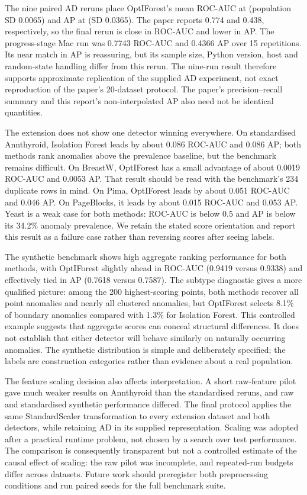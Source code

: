 The nine paired AD reruns place OptIForest's mean ROC-AUC at \adAuc{} (population SD 0.0065) and AP at \adAp{} (SD 0.0365). The paper reports 0.774 and 0.438, respectively, so the final rerun is close in ROC-AUC and lower in AP. The progress-stage Mac run was 0.7743 ROC-AUC and 0.4366 AP over 15 repetitions. Its near match in AP is reassuring, but its sample size, Python version, host and random-state handling differ from this rerun. The nine-run result therefore supports approximate replication of the supplied AD experiment, not exact reproduction of the paper's 20-dataset protocol. The paper's precision--recall summary and this report's non-interpolated AP also need not be identical quantities.

The extension does not show one detector winning everywhere. On standardised Annthyroid, Isolation Forest leads by about 0.086 ROC-AUC and 0.086 AP; both methods rank anomalies above the prevalence baseline, but the benchmark remains difficult. On BreastW, OptIForest has a small advantage of about 0.0019 ROC-AUC and 0.0053 AP. That result should be read with the benchmark's 234 duplicate rows in mind. On Pima, OptIForest leads by about 0.051 ROC-AUC and 0.046 AP. On PageBlocks, it leads by about 0.015 ROC-AUC and 0.053 AP. Yeast is a weak case for both methods: ROC-AUC is below 0.5 and AP is below its 34.2\% anomaly prevalence. We retain the stated score orientation and report this result as a failure case rather than reversing scores after seeing labels.

The synthetic benchmark shows high aggregate ranking performance for both methods, with OptIForest slightly ahead in ROC-AUC (0.9419 versus 0.9338) and effectively tied in AP (0.7618 versus 0.7587). The subtype diagnostic gives a more qualified picture: among the 200 highest-scoring points, both methods recover all point anomalies and nearly all clustered anomalies, but OptIForest selects 8.1\% of boundary anomalies compared with 1.3\% for Isolation Forest. This controlled example suggests that aggregate scores can conceal structural differences. It does not establish that either detector will behave similarly on naturally occurring anomalies. The synthetic distribution is simple and deliberately specified; the labels are construction categories rather than evidence about a real population.

The feature scaling decision also affects interpretation. A short raw-feature pilot gave much weaker results on Annthyroid than the standardised reruns, and raw and standardised synthetic performance differed. The final protocol applies the same StandardScaler transformation to every extension dataset and both detectors, while retaining AD in its supplied representation. Scaling was adopted after a practical runtime problem, not chosen by a search over test performance. The comparison is consequently transparent but not a controlled estimate of the causal effect of scaling: the raw pilot was incomplete, and repeated-run budgets differ across datasets. Future work should preregister both preprocessing conditions and run paired seeds for the full benchmark suite.

